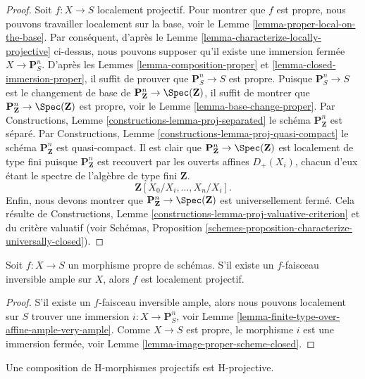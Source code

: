 \begin{proof}
Soit $f : X \to S$ localement projectif.
Pour montrer que $f$ est propre, nous
pouvons travailler localement sur la
base, voir le Lemme \ref{lemma-proper-local-on-the-base}. Par conséquent,
d'après le Lemme \ref{lemma-characterize-locally-projective} ci-dessus, nous pouvons supposer
qu'il existe une immersion
fermée $X \to \mathbf{P}^n_S$. D'après les Lemmes \ref{lemma-composition-proper}
et \ref{lemma-closed-immersion-proper}, il suffit de prouver
que $\mathbf{P}^n_S \to S$ est propre.
Puisque $\mathbf{P}^n_S \to S$ est le changement de base de
$\mathbf{P}^n_{\mathbf{Z}} \to \Spec(\mathbf{Z})$, il suffit de montrer que $\mathbf{P}^n_{\mathbf{Z}} \to \Spec(\mathbf{Z})$
est propre, voir le Lemme \ref{lemma-base-change-proper}.
Par Constructions, Lemme \ref{constructions-lemma-proj-separated} le schéma $\mathbf{P}^n_{\mathbf{Z}}$
est séparé. Par Constructions,
Lemme \ref{constructions-lemma-proj-quasi-compact} le schéma $\mathbf{P}^n_{\mathbf{Z}}$ est quasi-compact.
Il est clair que $\mathbf{P}^n_{\mathbf{Z}} \to \Spec(\mathbf{Z})$
est localement de type fini puisque $\mathbf{P}^n_{\mathbf{Z}}$
est recouvert par les ouverts affines $D_{+}(X_i)$,
chacun d'eux étant le spectre de l'algèbre
de type fini $\mathbf{Z}$.
$$
\mathbf{Z}[X_0/X_i, \ldots, X_n/X_i].
$$
Enfin, nous devons
montrer que $\mathbf{P}^n_{\mathbf{Z}} \to \Spec(\mathbf{Z})$ est universellement
fermé. Cela
résulte de Constructions, Lemme \ref{constructions-lemma-proj-valuative-criterion}
et du critère valuatif
(voir Schémas, Proposition \ref{schemes-proposition-characterize-universally-closed}).
\end{proof}

\begin{lemma}
\label{lemma-proper-ample-locally-projective}
Soit $f : X \to S$ un morphisme propre de schémas. S'il existe un $f$-faisceau
inversible ample sur $X$, alors $f$ est localement projectif.
\end{lemma}

\begin{proof}
S'il existe un $f$-faisceau inversible ample, alors
nous pouvons localement sur $S$ trouver une
immersion $i : X \to \mathbf{P}^n_S$, voir Lemme \ref{lemma-finite-type-over-affine-ample-very-ample}. Comme $X \to S$
est propre, le morphisme $i$ est une immersion
fermée, voir Lemme \ref{lemma-image-proper-scheme-closed}.
\end{proof}

\begin{lemma}
\label{lemma-H-projective-composition}
Une composition de H-morphismes projectifs est H-projective.
\end{lemma}

